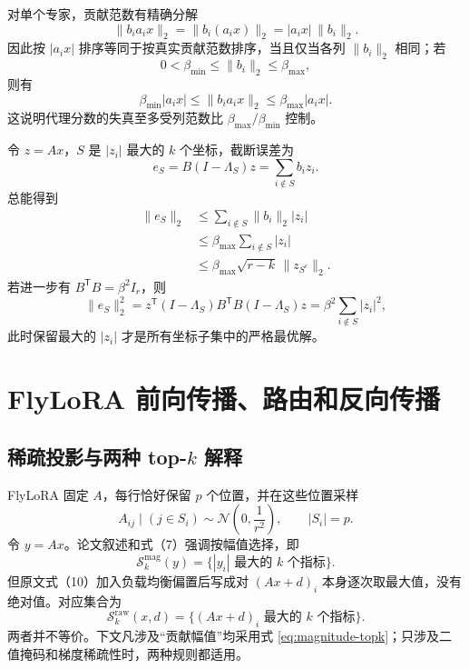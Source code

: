 \documentclass[11pt]{article}
\numberwithin{equation}{section}
\newcommand{\1}{\mathbf{1}}
\newcommand{\cN}{\mathcal{N}}
\newcommand{\cS}{\mathcal{S}}
\begin{document}
对单个专家，贡献范数有精确分解
\begin{equation}
  \|b_i a_i x\|_2
  =\|b_i(a_i x)\|_2
  =|a_i x|\,\|b_i\|_2.
  \label{eq:expert-magnitude}
\end{equation}
因此按 $|a_i x|$ 排序等同于按真实贡献范数排序，当且仅当各列 $\|b_i\|_2$ 相同；若
\begin{equation}
  0<\beta_{\min}\le \|b_i\|_2\le\beta_{\max},
\end{equation}
则有
\begin{equation}
  \beta_{\min}|a_i x|
  \le \|b_i a_i x\|_2
  \le \beta_{\max}|a_i x|.
\end{equation}
这说明代理分数的失真至多受列范数比 $\beta_{\max}/\beta_{\min}$ 控制。

令 $z=Ax$，$S$ 是 $|z_i|$ 最大的 $k$ 个坐标，截断误差为
\begin{equation}
  e_S=B(I-\Lambda_S)z=\sum_{i\notin S}b_i z_i.
\end{equation}
总能得到
\begin{align}
  \|e_S\|_2
  &\le\sum_{i\notin S}\|b_i\|_2|z_i| \\
  &\le\beta_{\max}\sum_{i\notin S}|z_i| \\
  &\le\beta_{\max}\sqrt{r-k}\,\|z_{S^c}\|_2.
  \label{eq:truncation-bound}
\end{align}
若进一步有 $B^{\mathsf{T}} B=\beta^2I_r$，则
\begin{equation}
  \|e_S\|_2^2
  =z^{\mathsf{T}}(I-\Lambda_S)B^{\mathsf{T}} B(I-\Lambda_S)z
  =\beta^2\sum_{i\notin S}|z_i|^2,
\end{equation}
此时保留最大的 $|z_i|$ 才是所有坐标子集中的严格最优解。

\section{FlyLoRA 前向传播、路由和反向传播}

\subsection{稀疏投影与两种 top-$k$ 解释}

FlyLoRA 固定 $A$，每行恰好保留 $p$ 个位置，并在这些位置采样
\begin{equation}
  A_{ij}\mid(j\in S_i)\sim\cN\!\left(0,\frac{1}{r^2}\right),
  \qquad |S_i|=p.
  \label{eq:exact-p-model}
\end{equation}
令 $y=Ax$。论文叙述和式（7）强调按幅值选择，即
\begin{equation}
  \cS_k^{\mathrm{mag}}(y)
  =\{\text{$|y_i|$ 最大的 $k$ 个指标}\}.
  \label{eq:magnitude-topk}
\end{equation}
但原文式（10）加入负载均衡偏置后写成对 $(Ax+d)_i$ 本身逐次取最大值，没有绝对值。对应集合为
\begin{equation}
  \cS_k^{\mathrm{raw}}(x,d)
  =\{\text{$(Ax+d)_i$ 最大的 $k$ 个指标}\}.
  \label{eq:raw-topk}
\end{equation}
两者并不等价。下文凡涉及“贡献幅值”均采用式 \eqref{eq:magnitude-topk}；只涉及二值掩码和梯度稀疏性时，两种规则都适用。
\end{document}

